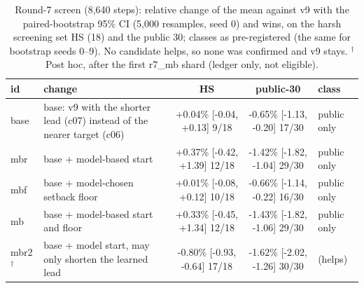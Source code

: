 \begin{table}[!htbp]
\caption{Round-7 screen (8,640 steps): relative change of the mean against v9 with the paired-bootstrap 95\% CI (5,000 resamples, seed 0) and wins, on the harsh screening set HS (18) and the public 30; classes as pre-registered (the same for bootstrap seeds 0--9). No candidate helps, so none was confirmed and v9 stays. $^\dagger$Post hoc, after the first r7\_mb shard (ledger only, not eligible).}
\label{tab:candidates_r7}
\centering\scriptsize
\setlength{\tabcolsep}{3pt}
\begin{tabular}{p{1.3cm}p{4.2cm}ccl}
\toprule
id & change & HS & public-30 & class \\
\midrule
base & base: v9 with the shorter lead (c07) instead of the nearer target (c06) & +0.04\% [-0.04, +0.13] 9/18 & -0.65\% [-1.13, -0.20] 17/30 & public only \\
mbr & base + model-based start & +0.37\% [-0.42, +1.39] 12/18 & -1.42\% [-1.82, -1.04] 29/30 & public only \\
mbf & base + model-chosen setback floor & +0.01\% [-0.08, +0.12] 10/18 & -0.66\% [-1.14, -0.22] 16/30 & public only \\
mb & base + model-based start and floor & +0.33\% [-0.45, +1.34] 12/18 & -1.43\% [-1.82, -1.06] 29/30 & public only \\
\midrule
mbr2$^\dagger$ & base + model start, may only shorten the learned lead & -0.80\% [-0.93, -0.64] 17/18 & -1.62\% [-2.02, -1.26] 30/30 & (helps) \\
\bottomrule
\end{tabular}
\end{table}
